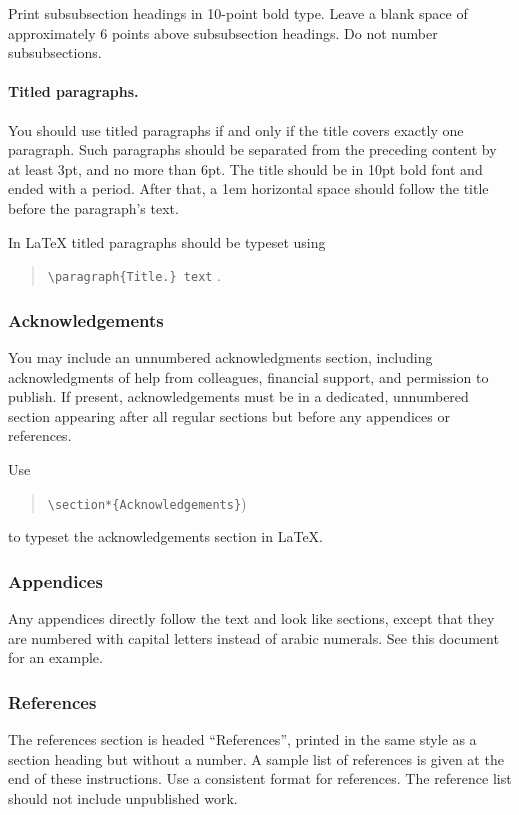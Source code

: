\documentclass{article}
\begin{document}
Print subsubsection headings in 10-point bold type. Leave a blank
space of approximately 6 points above subsubsection headings. Do not
number subsubsections.

\paragraph{Titled paragraphs.} You should use titled paragraphs if and
only if the title covers exactly one paragraph. Such paragraphs should be
separated from the preceding content by at least 3pt, and no more than
6pt. The title should be in 10pt bold font and ended with a period.
After that, a 1em horizontal space should follow the title before
the paragraph's text.

In \LaTeX{} titled paragraphs should be typeset using
\begin{quote}
{\tt \textbackslash{}paragraph\{Title.\} text} .
\end{quote}

\subsubsection{Acknowledgements}

You may include an unnumbered acknowledgments section, including
acknowledgments of help from colleagues, financial support, and
permission to publish. If present, acknowledgements must be in a dedicated,
unnumbered section appearing after all regular sections but before any
appendices or references.

Use
\begin{quote}
    {\tt \textbackslash{}section*\{Acknowledgements\}})
\end{quote}
to typeset the acknowledgements section in \LaTeX{}.

\subsubsection{Appendices}

Any appendices directly follow the text and look like sections, except
that they are numbered with capital letters instead of arabic
numerals. See this document for an example.

\subsubsection{References}

The references section is headed ``References'', printed in the same
style as a section heading but without a number. A sample list of
references is given at the end of these instructions. Use a consistent
format for references. The reference list should not include unpublished
work.
\end{document}
